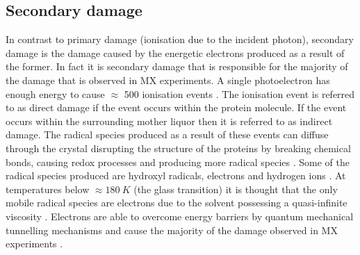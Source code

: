     \subsection{Secondary damage}
    \label{sub:Secondary damage}
        In contrast to primary damage (ionisation due to the incident photon), secondary damage is the damage caused by the energetic electrons produced as a result of the former.
        In fact it is secondary damage that is responsible for the majority of the damage that is observed in MX experiments.
        A single photoelectron has enough energy to cause $\approx$ 500 ionisation events \cite{o2002physical}. The ionisation event is referred to as direct damage if the event occurs within the protein molecule.
        If the event occurs within the surrounding mother liquor then it is referred to as indirect damage.
        The radical species produced as a result of these events can diffuse through the crystal disrupting the structure of the proteins by breaking chemical bonds, causing redox processes and producing more radical species \cite{meents2010}.
		Some of the radical species produced are hydroxyl radicals, electrons and hydrogen ions \cite{garman2010}.
        At temperatures below $\approx 180\ K$ (the glass transition) it is thought that the only mobile radical species are electrons \cite{jones1987structure} due to the solvent possessing a quasi-infinite viscosity \cite{weik2001specific}.
		Electrons are able to overcome energy barriers by quantum mechanical tunnelling mechanisms \cite{garman2009radiation} and cause the majority of the damage observed in MX experiments \cite{garman2010}.

